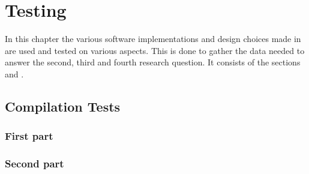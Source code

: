 \chapter{Testing}%
\label{chap:testing}

In this chapter the various software implementations and design choices made in  are used and tested on various aspects. 
This is done to gather the data needed to answer the second, third and fourth research question. 
It consists of the sections  and .


\section{Compilation Tests}
\label{sec:analyses:compilation}

\subsection{First part}

\begin{note}
\end{note}
  
\subsection{Second part}


